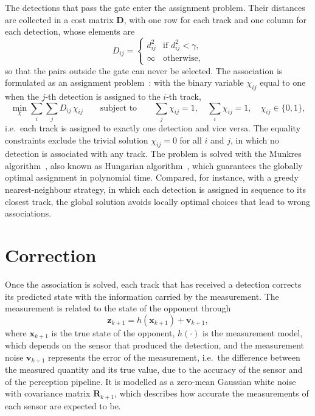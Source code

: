 The detections that pass the gate enter the assignment problem. Their
distances are collected in a cost matrix $\mathbf{D}$, with one row for each track and
one column for each detection, whose elements are
\begin{equation}
    D_{ij} =
    \begin{cases}
        d_{ij}^2 & \text{if } d_{ij}^2 < \gamma, \\
        \infty   & \text{otherwise},
    \end{cases}
    \label{eq:tt_cost}
\end{equation}
so that the pairs outside the gate can never be selected. The association is formulated
as an assignment problem~\cite{kuhn1955,munkres1957}: with the binary variable $\chi_{ij}$
equal to one when the $j$-th detection is assigned to the $i$-th track,
\begin{equation}
    \min_{\chi} \sum_i \sum_j D_{ij}\,\chi_{ij}
    \qquad \text{subject to} \qquad
    \sum_j \chi_{ij} = 1, \quad \sum_i \chi_{ij} = 1, \quad \chi_{ij} \in \{0, 1\},
    \label{eq:tt_assignment}
\end{equation}
i.e.\ each track is assigned to exactly one detection and vice versa. The equality
constraints exclude the trivial solution $\chi_{ij} = 0$ for all $i$ and $j$, in which no
detection is associated with any track. The problem is solved with the Munkres algorithm~\cite{munkres1957}, also known as Hungarian
algorithm~\cite{kuhn1955}, which guarantees the globally optimal assignment in polynomial time. Compared,
for instance, with a greedy nearest-neighbour strategy, in which each detection is
assigned in sequence to its closest track, the global solution avoids locally optimal
choices that lead to wrong associations.

\section{Correction}
\label{sec:tt_correction}

Once the association is solved, each track that has received a detection corrects its
predicted state with the information carried by the measurement. The measurement is
related to the state of the opponent through
\begin{equation}
    \mathbf{z}_{k+1} = h(\mathbf{x}_{k+1}) + \mathbf{v}_{k+1},
    \label{eq:tt_meas_eq}
\end{equation}
where $\mathbf{x}_{k+1}$ is the true state of the opponent, $h(\cdot)$ is the measurement
model, which depends on the sensor that produced the detection, and the measurement noise $\mathbf{v}_{k+1}$ represents the error of the
measurement, i.e.\ the difference between the measured quantity and its true value, due
to the accuracy of the sensor and of the perception pipeline. It is modelled as a
zero-mean Gaussian white noise with covariance matrix $\mathbf{R}_{k+1}$, which describes
how accurate the measurements of each sensor are expected to be.


